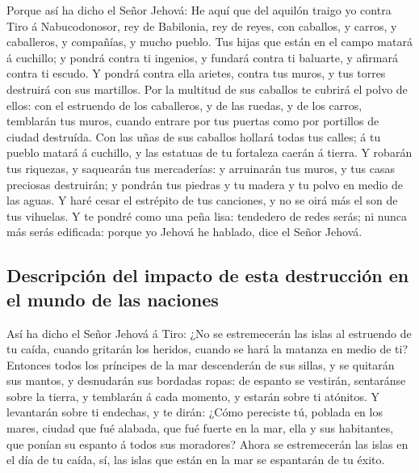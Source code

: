  Porque así ha dicho el Señor Jehová: He aquí que del
aquilón traigo yo contra Tiro á Nabucodonosor, rey de Babilonia, rey de
reyes, con caballos, y carros, y caballeros, y compañías, y mucho
pueblo.  Tus hijas que están en el campo matará á cuchillo;
y pondrá contra ti ingenios, y fundará contra ti baluarte, y afirmará
contra ti escudo.  Y pondrá contra ella arietes, contra tus
muros, y tus torres destruirá con sus martillos.  Por la
multitud de sus caballos te cubrirá el polvo de ellos: con el estruendo
de los caballeros, y de las ruedas, y de los carros, temblarán tus
muros, cuando entrare por tus puertas como por portillos de ciudad
destruída.  Con las uñas de sus caballos hollará todas tus
calles; á tu pueblo matará á cuchillo, y las estatuas de tu fortaleza
caerán á tierra.  Y robarán tus riquezas, y saquearán tus
mercaderías: y arruinarán tus muros, y tus casas preciosas destruirán; y
pondrán tus piedras y tu madera y tu polvo en medio de las aguas.
 Y haré cesar el estrépito de tus canciones, y no se oirá
más el son de tus vihuelas.  Y te pondré como una peña
lisa: tendedero de redes serás; ni nunca más serás edificada: porque yo
Jehová he hablado, dice el Señor Jehová.

\hypertarget{descripciuxf3n-del-impacto-de-esta-destrucciuxf3n-en-el-mundo-de-las-naciones}{%
\subsection{Descripción del impacto de esta destrucción en el mundo de
las
naciones}\label{descripciuxf3n-del-impacto-de-esta-destrucciuxf3n-en-el-mundo-de-las-naciones}}

 Así ha dicho el Señor Jehová á Tiro: ¿No se estremecerán
las islas al estruendo de tu caída, cuando gritarán los heridos, cuando
se hará la matanza en medio de ti?  Entonces todos los
príncipes de la mar descenderán de sus sillas, y se quitarán sus mantos,
y desnudarán sus bordadas ropas: de espanto se vestirán, sentaránse
sobre la tierra, y temblarán á cada momento, y estarán sobre ti
atónitos.  Y levantarán sobre ti endechas, y te dirán:
¿Cómo pereciste tú, poblada en los mares, ciudad que fué alabada, que
fué fuerte en la mar, ella y sus habitantes, que ponían su espanto á
todos sus moradores?  Ahora se estremecerán las islas en el
día de tu caída, sí, las islas que están en la mar se espantarán de tu
éxito.

